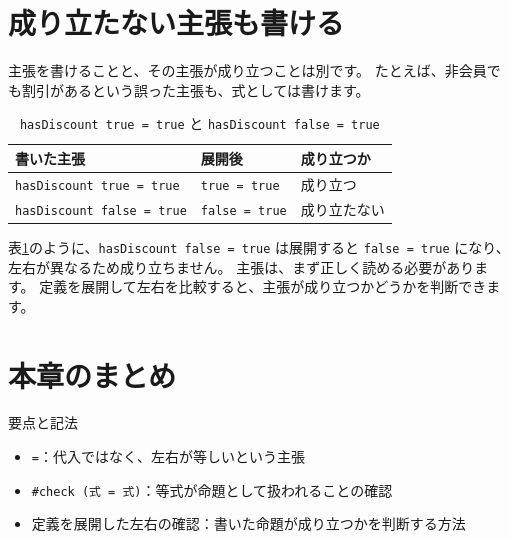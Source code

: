 \section{成り立たない主張も書ける}

主張を書けることと、その主張が成り立つことは別です。
たとえば、非会員でも割引があるという誤った主張も、式としては書けます。

\begin{table}[htbp]
\centering
\caption{\texttt{hasDiscount true = true} と \texttt{hasDiscount false = true}}
\label{tab:ch03-true-false}
\begin{tabular}{lll}
\toprule
書いた主張 & 展開後 & 成り立つか \\
\midrule
\texttt{hasDiscount true = true} & \texttt{true = true} & 成り立つ \\
\texttt{hasDiscount false = true} & \texttt{false = true} & 成り立たない \\
\bottomrule
\end{tabular}
\end{table}

表\ref{tab:ch03-true-false}のように、\texttt{hasDiscount false = true} は展開すると \texttt{false = true} になり、左右が異なるため成り立ちません。
主張は、まず正しく読める必要があります。
定義を展開して左右を比較すると、主張が成り立つかどうかを判断できます。

\section{本章のまとめ}

要点と記法
\begin{itemize}
\item \texttt{=}：代入ではなく、左右が等しいという主張
\item \texttt{\#check (式 = 式)}：等式が命題として扱われることの確認
\item 定義を展開した左右の確認：書いた命題が成り立つかを判断する方法
\end{itemize}
